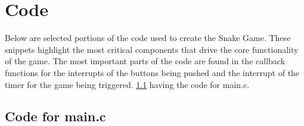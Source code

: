 \section{Code}
\label{sec:code}

Below are selected portions of the code used to create the Snake Game. These snippets highlight the most critical components that drive the core functionality of the game. The most important parts of the code are found in the callback functions for the interrupts of the buttons being pushed and the interrupt of the timer for the game being triggered. 
\ref{subsec:main_c} having the code for main.c.

\subsection{Code for main.c}
\label{subsec:main_c}

